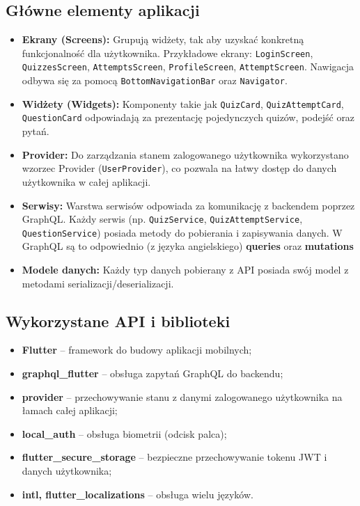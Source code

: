 \documentclass{article}
\begin{document}
		\subsection*{Główne elementy aplikacji}
			\begin{itemize}
				\item \textbf{Ekrany (Screens):} Grupują widżety, tak aby uzyskać konkretną funkcjonalność dla użytkownika. Przykładowe ekrany: \texttt{LoginScreen}, \texttt{QuizzesScreen}, \texttt{AttemptsScreen}, \texttt{ProfileScreen}, \texttt{AttemptScreen}. Nawigacja odbywa się za pomocą \texttt{BottomNavigationBar} oraz \texttt{Navigator}.
				\item \textbf{Widżety (Widgets):} Komponenty takie jak \texttt{QuizCard}, \texttt{QuizAttemptCard}, \texttt{QuestionCard} odpowiadają za prezentację pojedynczych quizów, podejść oraz pytań.
				\item \textbf{Provider:} Do zarządzania stanem zalogowanego użytkownika wykorzystano wzorzec Provider (\texttt{UserProvider}), co pozwala na łatwy dostęp do danych użytkownika w całej aplikacji.
				\item \textbf{Serwisy:} Warstwa serwisów odpowiada za komunikację z backendem poprzez GraphQL. Każdy serwis (np. \texttt{QuizService}, \texttt{QuizAttemptService}, \texttt{QuestionService}) posiada metody do pobierania i zapisywania danych. W GraphQL są to odpowiednio (z języka angielskiego) \textbf{queries} oraz \textbf{mutations}
				\item \textbf{Modele danych:} Każdy typ danych pobierany z API posiada swój model z metodami serializacji/deserializacji.
			\end{itemize}

		\subsection*{Wykorzystane API i biblioteki}
			\begin{itemize}
				\item \textbf{Flutter} -- framework do budowy aplikacji mobilnych;
				\item \textbf{graphql\_flutter} -- obsługa zapytań GraphQL do backendu;
				\item \textbf{provider} -- przechowywanie stanu z danymi zalogowanego użytkownika na łamach całej aplikacji;
				\item \textbf{local\_auth} -- obsługa biometrii (odcisk palca);
				\item \textbf{flutter\_secure\_storage} -- bezpieczne przechowywanie tokenu JWT i danych użytkownika;
				\item \textbf{intl, flutter\_localizations} -- obsługa wielu języków.
			\end{itemize}
\end{document}
